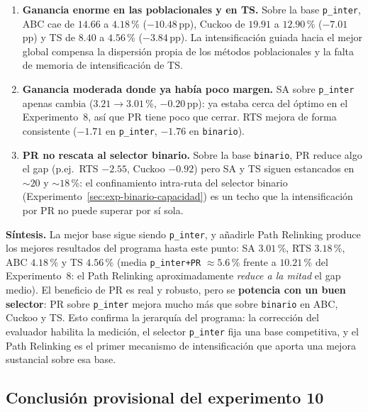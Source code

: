 \begin{enumerate}
\item \textbf{Ganancia enorme en las poblacionales y en TS.} Sobre la base
  \texttt{p\_inter}, ABC cae de $14.66$ a $4.18$\,\% ($-10.48$\,pp), Cuckoo de
  $19.91$ a $12.90$\,\% ($-7.01$\,pp) y TS de $8.40$ a $4.56$\,\% ($-3.84$\,pp).
  La intensificación guiada hacia el mejor global compensa la dispersión propia
  de los métodos poblacionales y la falta de memoria de intensificación de TS.
\item \textbf{Ganancia moderada donde ya había poco margen.} SA sobre
  \texttt{p\_inter} apenas cambia ($3.21 \to 3.01$\,\%, $-0.20$\,pp): ya estaba
  cerca del óptimo en el Experimento~8, así que PR tiene poco que cerrar. RTS
  mejora de forma consistente ($-1.71$ en \texttt{p\_inter}, $-1.76$ en
  \texttt{binario}).
\item \textbf{PR no rescata al selector binario.} Sobre la base \texttt{binario},
  PR reduce algo el gap (p.ej.\ RTS $-2.55$, Cuckoo $-0.92$) pero SA y TS siguen
  estancados en $\sim$$20$ y $\sim$$18$\,\%: el confinamiento intra-ruta del
  selector binario (Experimento~\ref{sec:exp-binario-capacidad}) es un techo
  que la intensificación por PR no puede superar por sí sola.
\end{enumerate}

\noindent\textbf{Síntesis.} La mejor base sigue siendo \texttt{p\_inter}, y
añadirle Path Relinking produce los mejores resultados del programa hasta este
punto: SA $3.01$\,\%, RTS $3.18$\,\%, ABC $4.18$\,\% y TS $4.56$\,\%
(media \texttt{p\_inter+PR} $\approx 5.6$\,\% frente a $10.21$\,\% del
Experimento~8: el Path Relinking aproximadamente \emph{reduce a la mitad} el gap
medio). El beneficio de PR es real y robusto, pero se \textbf{potencia con un
buen selector}: PR sobre \texttt{p\_inter} mejora mucho más que sobre
\texttt{binario} en ABC, Cuckoo y TS. Esto confirma la jerarquía del programa:
la corrección del evaluador habilita la medición, el selector
\texttt{p\_inter} fija una base competitiva, y el Path Relinking es el primer
mecanismo de intensificación que aporta una mejora sustancial sobre esa base.

\subsection{Conclusión provisional del experimento 10}

